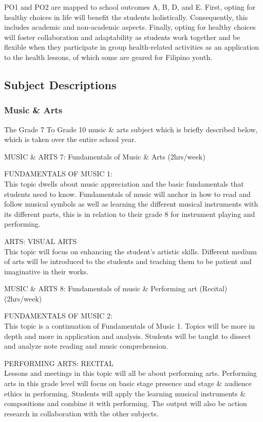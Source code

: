 PO1 and PO2 are mapped to school outcomes A, B, D, and E. First, opting for healthy choices in life will benefit the students holistically. Consequently, this includes academic and non-academic aspects. Finally, opting for healthy choices will foster collaboration and adaptability as students work together and be flexible when they participate in group health-related activities as an application to the health lessons, of which some are geared for Filipino youth.

\subsection{Subject Descriptions}

\subsubsection{\textbf{Music \& Arts}}
The Grade 7 To Grade 10 music \& arts subject which is briefly described below, which is taken over the entire school year. 

\begin{subject}
	MUSIC \& ARTS 7: Fundamentals of Music \& Arts 
	\hfill
	(2hrs/week)
\end{subject}
FUNDAMENTALS OF MUSIC 1: \\
This topic dwells about music appreciation and the basic fundamentals that students need to know. Fundamentals of music will anchor in how to read and follow musical symbols as well as learning the different musical instruments with its different parts, this is in relation to their grade 8
for instrument playing and performing.

ARTS: VISUAL ARTS \\
This topic will focus on enhancing the student’s artistic skills. Different medium of arts will be introduced to the students and teaching them to be patient and imaginative in their works.

\begin{subject}
	MUSIC \& ARTS 8: Fundamentals of music \& Performing art (Recital) 
	\hfill
	(2hrs/week)
\end{subject}

FUNDAMENTALS OF MUSIC 2: \\
This topic is a continuation of Fundamentals of Music 1. Topics will be more in depth and more in application and analysis. Students will be taught to dissect and analyze note reading and music comprehension.

PERFORMING ARTS: RECITAL \\
Lessons and meetings in this topic will all be about performing arts. Performing arts in this grade level will focus on basic stage presence and stage \& audience ethics in performing. Students will apply the learning musical instruments \& compositions and combine it with performing. The output will also be action research in collaboration with the other subjects.



